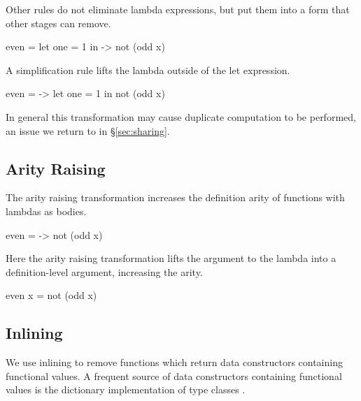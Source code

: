 \documentclass[preprint]{sigplanconf}
\begin{document}
\noindent Other rules do not eliminate lambda expressions, but put them into a form that other stages can remove.

\begin{example}
\begin{code}
even =  let one = 1
        in \x -> not (odd x)
\end{code}

\noindent A simplification rule lifts the lambda outside of the let expression.

\begin{code}
even = \x ->  let one = 1
              in not (odd x)
\end{code}

\noindent In general this transformation may cause duplicate computation to be performed, an issue we return to in \S\ref{sec:sharing}.
\end{example}


\subsection{Arity Raising}

The arity raising transformation increases the definition arity of functions with lambdas as bodies.

\begin{example}
\begin{code}
even = \x -> not (odd x)
\end{code}

Here the arity raising transformation lifts the argument to the lambda into a definition-level argument, increasing the arity.

\begin{code}
even x = not (odd x)
\end{code}
\end{example}


\subsection{Inlining}

We use inlining to remove functions which return data constructors containing functional values. A frequent source of data constructors containing functional values is the dictionary implementation of type classes \cite{wadler:type_classes}.
\end{document}
